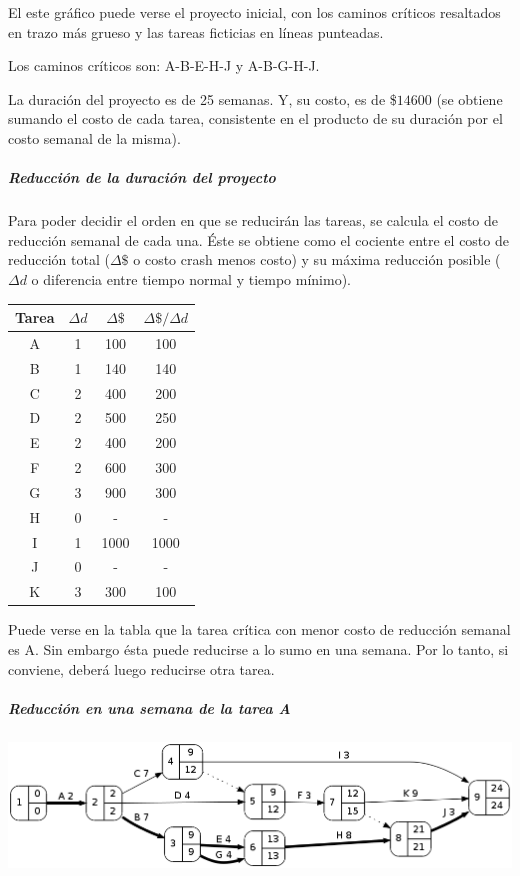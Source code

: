 \documentclass[a4paper,10pt]{article}
\begin{document}
  El este gráfico puede verse el proyecto inicial, con los caminos críticos resaltados en trazo más grueso y las tareas ficticias en líneas punteadas.

  Los caminos críticos son: A-B-E-H-J y A-B-G-H-J.

  La duración del proyecto es de 25 semanas. Y, su costo, es de \$$14600$ (se obtiene sumando el costo de cada tarea, consistente en el producto de su duración por el costo semanal de la misma).

  \subparagraph{Reducción de la duración del proyecto}

  Para poder decidir el orden en que se reducirán las tareas, se calcula el costo de reducción semanal de cada una. Éste se obtiene como el cociente entre el costo de reducción total ($\Delta \$$ o costo crash menos costo) y su máxima reducción posible ($\Delta d$ o diferencia entre tiempo normal y tiempo mínimo).

   \begin{center}
   \begin{tabular}{|| c | c | c | c ||}
   \hline 
      Tarea & $\Delta d$ & $\Delta \$$ & $\Delta \$ / \Delta d$ \\ \hline \hline
      A & 1 & 100 & 100 \\ \hline
      B & 1 & 140 & 140 \\ \hline 
      C & 2 & 400 & 200 \\ \hline
      D & 2 & 500 & 250 \\ \hline
      E & 2 & 400 & 200 \\ \hline
      F & 2 & 600 & 300 \\ \hline
      G & 3 & 900 & 300 \\ \hline
      H & 0 &  -  & -   \\ \hline
      I & 1 &1000 & 1000\\ \hline
      J & 0 &  -  & -   \\ \hline
      K & 3 & 300 & 100 \\ \hline
   \end{tabular}
   \end{center}

   Puede verse en la tabla que la tarea crítica con menor costo de reducción semanal es A. Sin embargo ésta puede reducirse a lo sumo en una semana. Por lo tanto, si conviene, deberá luego reducirse otra tarea.

  \subparagraph {Reducción en una semana de la tarea A}
  \begin{center}
    \includegraphics[scale=0.4,keepaspectratio=true]{img/ej3-1.png} 
  \end{center}
\end{document}
